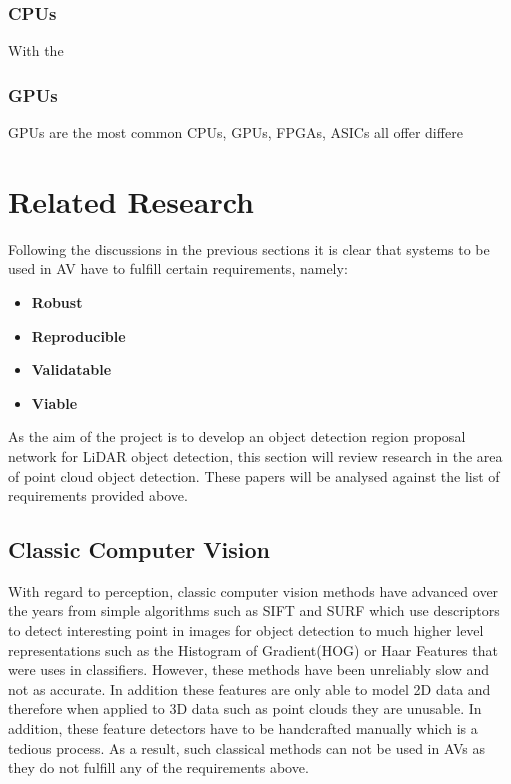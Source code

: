 \subsubsection{CPUs}
With the 



\subsubsection{GPUs}

GPUs are the most common 
CPUs, GPUs, FPGAs, ASICs all offer differe


\section{Related Research} 

Following the discussions in the previous sections it is clear that systems to be used in AV have to fulfill certain requirements, namely:
\begin{itemize}
	\item \textbf{Robust}
	\item \textbf{Reproducible}
	\item \textbf{Validatable}
	\item \textbf{Viable}
\end{itemize}

As the aim of the project is to develop an object detection region proposal network for LiDAR object detection, this section will review research in the area of point cloud object detection. These papers will be analysed against the list of requirements provided above. 

\subsection{Classic Computer Vision}
With regard to perception, classic computer vision methods have advanced over the years from simple algorithms such as SIFT\cite{lowe1999object} and SURF\cite{bay2006surf} which use descriptors to detect interesting point in images for object detection to much higher level representations such as the Histogram of Gradient(HOG)\cite{dalal2005histograms} or Haar Features\cite{viola2001rapid}  that were uses in classifiers.  However, these methods have been unreliably slow and not as accurate. In addition these features are only able to model 2D data and therefore when applied to 3D data such as point clouds they are unusable. In addition, these feature detectors have to be handcrafted manually which is a tedious process. As a result,  such classical methods can not be used in AVs as they do not fulfill any of the requirements above. 


